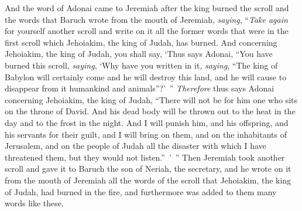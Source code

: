 \begin{biblechapter}
\verse And the word of Adonai came to Jeremiah after the king burned the scroll and the words that Baruch wrote from the mouth of Jeremiah, \textit{saying},
\verse “\textit{Take again} for yourself another scroll and write on it all the former words that were in the first scroll which Jehoiakim, the king of Judah, has burned.
\verse And concerning Jehoiakim, the king of Judah, you shall say, ‘Thus says Adonai, “You have burned this scroll, \textit{saying}, ‘Why have you written in it, \textit{saying}, “The king of Babylon will certainly come and he will destroy this land, and he will cause to disappear from it humankind and animals”?’ ”
\verse \textit{Therefore} thus says Adonai concerning Jehoiakim, the king of Judah, “There will not be for him one who sits on the throne of David. And his dead body will be thrown out to the heat in the day and to the frost in the night.
\verse And I will punish him, and his offspring, and his servants for their guilt, and I will bring on them, and on the inhabitants of Jerusalem, and on the people of Judah all the disaster with which I have threatened them, but they would not listen.” ’ ”
\verse Then Jeremiah took another scroll and gave it to Baruch the son of Neriah, the secretary, and he wrote on it from the mouth of Jeremiah all the words of the scroll that Jehoiakim, the king of Judah, had burned in the fire, and furthermore was added to them many words like these.
\end{biblechapter}

